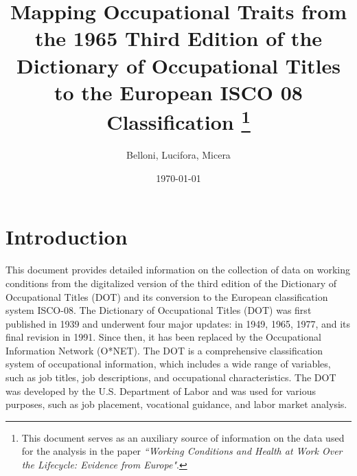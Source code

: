 \documentclass[11pt, a4paper, leqno]{article}
\title{Mapping Occupational Traits from the 1965 Third Edition of the Dictionary of Occupational Titles to the European ISCO 08 Classification \thanks{This document serves as an auxiliary source of information on the data used for the analysis in the paper \textit{``Working Conditions and Health at Work Over the Lifecycle: Evidence from Europe"}.}}
\author{Belloni, Lucifora, Micera}
\date{\today}
\begin{document}
\maketitle

\section{Introduction}
This document provides detailed information on the collection of data on working conditions from the digitalized version of the third edition of the Dictionary of Occupational Titles (DOT) and its conversion to the European classification system ISCO-08. 
The Dictionary of Occupational Titles (DOT) was first published in 1939 and underwent four major updates: in 1949, 1965, 1977, and its final revision in 1991. Since then, it has been replaced by the Occupational Information Network (O*NET). The DOT is a comprehensive classification system of occupational information, which includes a wide range of variables, such as job titles, job descriptions, and occupational characteristics. The DOT was developed by the U.S. Department of Labor and was used for various purposes, such as job placement, vocational guidance, and labor market analysis.






\newpage
\nocite{*}
\printbibliography
\end{document}
